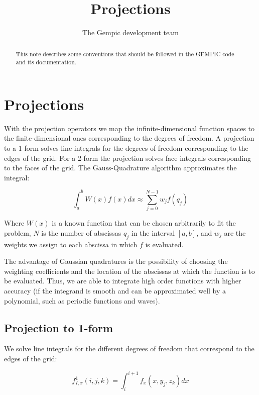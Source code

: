\documentclass[11pt]{article}
\title{Projections}
\author[1]{The Gempic development team}
\affil[1]{Max-Planck-Institut f\"ur Plasmaphysik, Garching, Germany}
\begin{document}
\maketitle

\begin{abstract}
This note describes some conventions that should be followed in the GEMPIC code
and its documentation.
\end{abstract}

\tableofcontents

\section{Projections}
With the projection operators we map the infinite-dimensional function spaces to the finite-dimensional ones corresponding to the degrees of freedom. A projection to a 1-form solves line integrals for the degrees of freedom corresponding to the edges of the grid. For a 2-form the projection solves face integrals corresponding to the faces of the grid. The Gauss-Quadrature algorithm approximates the integral: 

\begin{equation}
    \int_ a ^ b W(x) f(x) dx \approx \sum_{j=0}^{N-1} w_j f(q_j)
\end{equation}

Where $W(x)$ is a known function that can be chosen arbitrarily to fit the problem, $N$ is the number of abscissas $q_j$ in the interval $\left[a, b\right]$, and $w_j$ are the weights we assign to each abscissa in which $f$ is evaluated.

The advantage of Gaussian quadratures is the possibility of choosing the weighting coefficients and the location of the abscissas at which the function is to be evaluated. Thus, we are able to integrate high order functions with higher accuracy (if the integrand is smooth and can be approximated well by a polynomial, such as periodic functions and waves).

\subsection{Projection to 1-form}
We solve line integrals for the different degrees of freedom that correspond to the edges of the grid:

\begin{equation}
    f_{I,x}^1(i, j, k) = \int _{i} ^ {i+1} f_x (x, y_j, z_k) dx
\end{equation}
\end{document}
